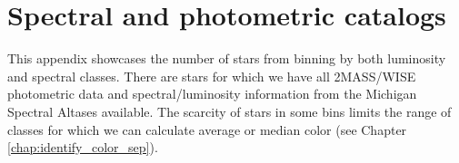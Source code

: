 \chapter{Spectral and photometric catalogs}\label{Appendix:1}
This appendix showcases the number of stars from binning by both luminosity and spectral classes. There are \bincount stars for which we have all 2MASS/WISE photometric data and spectral/luminosity information from the Michigan Spectral Altases available. The scarcity of stars in some bins limits the range of classes for which we can calculate average or median color (see Chapter \ref{chap:identify_color_sep}).


